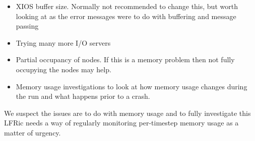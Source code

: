 \begin{itemize}
  \item XIOS buffer size. Normally not recommended to change this, but worth looking at as the error messages were to do with buffering and message passing
  \item Trying many more I/O servers
  \item Partial occupancy of nodes. If this is a memory problem then not fully occupying the nodes may help.
  \item Memory usage investigations to look at how memory usage changes during the run and what happens prior to a crash.
\end{itemize}


We suspect the issues are to do with memory usage and to fully investigate this LFRic needs a way of regularly monitoring per-timestep memory usage as a matter of urgency.
 

